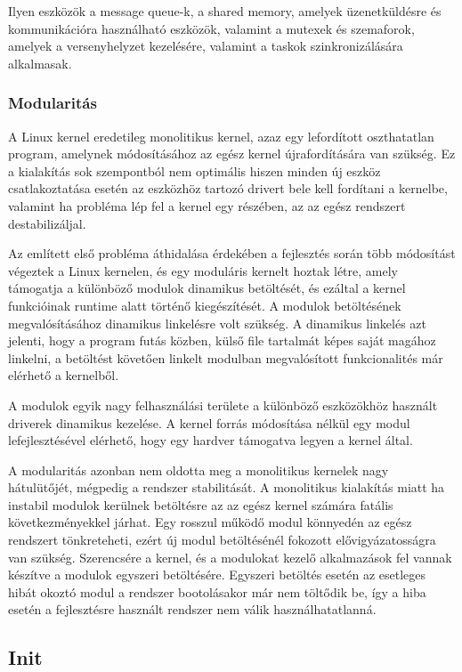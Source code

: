 Ilyen eszközök a message queue-k, a shared memory, amelyek üzenetküldésre és
kommunikációra használható eszközök, valamint a mutexek és szemaforok, amelyek a
versenyhelyzet kezelésére, valamint a taskok szinkronizálására alkalmasak.

\subsubsection{Modularitás}

A Linux kernel eredetileg monolitikus kernel, azaz egy lefordított oszthatatlan
program, amelynek módosításához az egész kernel újrafordítására van szükség. Ez a
kialakítás sok szempontból nem optimális hiszen minden új eszköz csatlakoztatása
esetén az eszközhöz tartozó drivert bele kell fordítani a kernelbe, valamint ha
probléma lép fel a kernel egy részében, az az egész rendszert destabilizáljal.

Az említett első probléma áthidalása érdekében a fejlesztés során több módosítást
végeztek a Linux kernelen, és egy moduláris kernelt hoztak létre, amely támogatja
a különböző modulok dinamikus betöltését, és ezáltal a kernel funkcióinak runtime
alatt történő kiegészítését. A modulok betöltésének megvalósításához dinamikus
linkelésre volt szükség. A dinamikus linkelés azt jelenti, hogy a program futás
közben, külső file tartalmát képes saját magához linkelni, a betöltést követően
linkelt modulban megvalósított funkcionalités már elérhető a kernelből.

A modulok egyik nagy felhasználási területe a különböző eszközökhöz használt
driverek dinamikus kezelése. A kernel forrás módosítása nélkül egy modul
lefejlesztésével elérhető, hogy egy hardver támogatva legyen a kernel által.

A modularitás azonban nem oldotta meg a monolitikus kernelek nagy hátulütőjét,
mégpedig a rendszer stabilitását. A monolitikus kialakítás miatt ha instabil
modulok kerülnek betöltésre az az egész kernel számára fatális következményekkel
járhat. Egy rosszul működő modul könnyedén az egész rendszert tönkreteheti, ezért
új modul betöltésénél fokozott elővigyázatosságra van szükség. Szerencsére a
kernel, és a modulokat kezelő alkalmazások fel vannak készítve a modulok egyszeri
betöltésére. Egyszeri betöltés esetén az esetleges hibát okoztó modul a
rendszer bootolásakor már nem töltődik be, így a hiba esetén a fejlesztésre
használt rendszer nem válik használhatatlanná. 

\subsection{Init}

